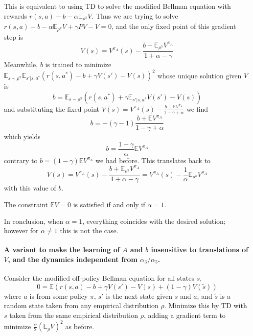 \documentclass[11pt]{article}
\newcommand{\E}{\mathbb{E}}
\begin{document}
This is equivalent to using TD
to solve the modified Bellman equation with
rewards $r(s,a)-b-\alpha \E_{\rho^\pi}V$. Thus we are trying to solve
$r(s,a)-b-\alpha \E_{\rho^\pi}V+\gamma PV-V=0$, and the only fixed point
of this gradient step is
\begin{equation}
V(s)=V^{\pi_A}(s)-\frac{b+\E_{\rho^\pi} V^{\pi_A}}{1+\alpha-\gamma}
\end{equation}
Meanwhile, $b$ is trained to minimize $\E_{s\sim
\rho^\pi}\E_{s'|s,a^\ast}
(r(s,a^\ast)-b+\gamma V(s')-V(s))^2$ whose unique
solution given $V$ is 
\begin{equation}
b=\E_{s\sim \rho^\pi}(r(s,a^\ast)+\gamma \E_{s'|s,a^\ast}V(s')-V(s))
\end{equation}
and substituting the fixed point
$V(s)=V^{\pi_A}(s)-\frac{b+\E V^{\pi_A}}{1-\gamma+\alpha}$ we find
\begin{equation}
b=-(\gamma-1) \frac{b+\E V^{\pi_A}}{1-\gamma+\alpha}
\end{equation}
which yields
\begin{equation}
b=\frac{1-\gamma}{\alpha} \E V^{\pi_A}
\end{equation}
contrary to $b=(1-\gamma)\E V^{\pi_A}$ we had before. 
This translates back to
\begin{equation}
V(s)=V^{\pi_A}(s)-\frac{b+\E_{\rho^\pi} V^{\pi_A}}{1+\alpha-\gamma}
=V^{\pi_A}(s)-\frac1\alpha \E_{\rho^\pi} V^{\pi_A}
\end{equation}
with this value of $b$.

The constraint $\E V=0$ is satisfied if and only if $\alpha=1$.

In conclusion, when $\alpha=1$, everything coincides with the desired
solution; however for $\alpha\neq 1$ this is not the case.

\paragraph{A variant to make the learning of $A$ and $b$ insensitive to
translations of $V$, and the dynamics independent from
$\alpha_3/\alpha_5$.} Consider the modified off-policy Bellman equation
for all states $s$,
\begin{equation}
0=\E \left(
r(s,a)-b+\gamma V(s')-V(s)+(1-\gamma)V(\tilde s)
\right)
\end{equation}
where $a$ is from some policy $\pi$, $s'$ is the next state given $s$ and
$a$, and $\tilde s$ is a random state taken from any empirical
distribution $\rho$. Minimize this by TD with $s$ taken from the same
empirical distribution $\rho$, adding a gradient term to minimize
$\frac{\alpha}{2} (\E_\rho V)^2$ as before.
\end{document}
